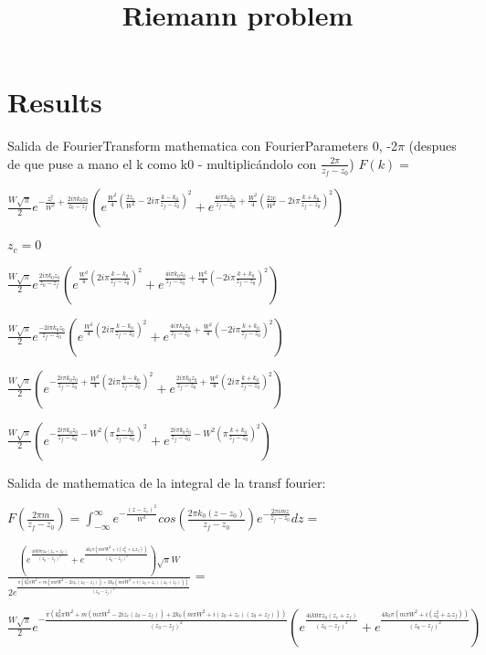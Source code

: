 \documentclass[12pt]{book}
\title{Riemann problem}
\date{}
\begin{document}
\section*{Results}


Salida de FourierTransform mathematica con FourierParameters 0, -2$\pi$  (despues de que puse a mano el k como k0 - multiplicándolo con $\frac{2 \pi}{z_f - z_0}$)
$F(k)= $


$ \frac{W \sqrt{\pi}}{2} e^{-\frac{z_c^2}{W^2} + \frac{ 2 i \pi k_0  z_0}{z_0 - z_f}} (e^{ \frac {W^2 }{4} ( \frac{2 z_c}{W^2} - 2 i \pi  \frac{k - k_0}{z_f - z_0})^2} + e^{ \frac{ 4i \pi k_0 z_0}{z_f-z_0} + \frac{W^2 }{4} ( \frac{2 zc}{W^2} - 2i \pi \frac{k + k_0}{z_f - z_0})^2}) $

$z_c = 0$

$ \frac{W \sqrt{\pi}}{2} e^{ \frac{ 2 i \pi k_0  z_0}{z_0 - z_f}} (e^{ \frac {W^2 }{4} ( 2 i \pi  \frac{k - k_0}{z_f - z_0})^2} + e^{ \frac{ 4i \pi k_0 z_0}{z_f-z_0} + \frac{W^2 }{4} ( - 2i \pi \frac{k + k_0}{z_f - z_0})^2}) $

$ \frac{W \sqrt{\pi}}{2} e^{ \frac{ - 2 i \pi k_0  z_0}{z_f - z_0}} (e^{ \frac {W^2 }{4} ( 2 i \pi  \frac{k - k_0}{z_f - z_0})^2} + e^{ \frac{ 4i \pi k_0 z_0}{z_f-z_0} + \frac{W^2 }{4} ( - 2i \pi \frac{k + k_0}{z_f - z_0})^2}) $

$ \frac{W \sqrt{\pi}}{2}  (e^{ - \frac{ 2 i \pi k_0  z_0}{z_f - z_0} + \frac {W^2 }{4} ( 2 i \pi  \frac{k - k_0}{z_f - z_0})^2} + e^{ \frac{ 2i \pi k_0 z_0}{z_f-z_0} + \frac{W^2 }{4} ( 2i \pi \frac{k + k_0}{z_f - z_0})^2}) $

$ \frac{W \sqrt{\pi}}{2}  (e^{ - \frac{ 2 i \pi k_0  z_0}{z_f - z_0} - W^2  (  \pi  \frac{k - k_0}{z_f - z_0})^2} + e^{ \frac{ 2i \pi k_0 z_0}{z_f-z_0} - W^2 (\pi \frac{k + k_0}{z_f - z_0})^2}) $


Salida de mathematica de la integral de la transf fourier:


$
F( \frac{2\pi m}{z_f - z_0} ) = \int_{- \infty}^{\infty}{e^{-\frac{(z-z_c)^2}{W^2}} cos(\frac{2 \pi k_0 (z-z_0)}{z_f - z_0}) e^{-\frac{2 \pi i m z }{z_f - z_0}} dz } = $



$
\frac{(e^{ \frac{ 4i k0 \pi z_0 (z_c + z_f)}{(z_0 - z_f)^2}} + e^{ \frac{4 k_0 \pi (m \pi W^2 + i (z_0^2 + z_c z_f))}{(z_0 - z_f)^2}}) \sqrt{\pi} W}{
  2 e^{ \frac{\pi (k_0^2 \pi W^2 + m (m \pi W^2 - 2i z_c (z_0 - z_f)) + 2 k_0 (m \pi W^2 + i(z_0 + z_c) (z_0 + z_f)))}{(z_0 - z_f)^2}}}
$ =

$ \frac{W \sqrt{\pi}}{2}  e^{-\frac{\pi (k_0^2 \pi W^2 + m (m \pi W^2 - 2i z_c (z_0 - z_f)) + 2 k_0 (m \pi W^2 + i(z_0 + z_c) (z_0 + z_f)))}{(z_0 - z_f)^2}} (e^{ \frac{ 4i k0 \pi z_0 (z_c + z_f)}{(z_0 - z_f)^2}} + e^{ \frac{4 k_0 \pi (m \pi W^2 + i (z_0^2 + z_c z_f))}{(z_0 - z_f)^2}})  $
\end{document}
